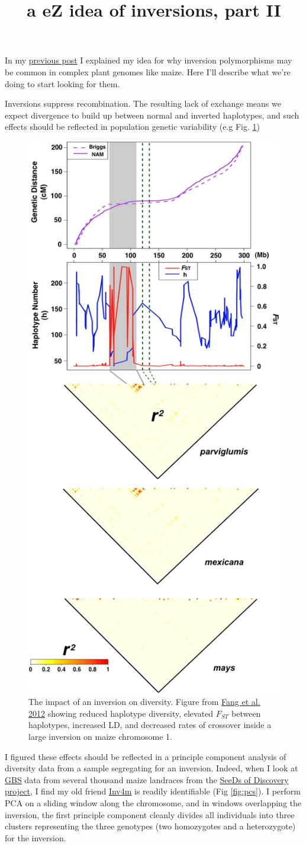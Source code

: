 \documentclass[]{article}
\begin{document}
\title{a eZ idea of inversions, part II}
\maketitle

In my \href{}{previous post} I explained my idea for why inversion polymorphisms may be common in complex plant genomes like maize. 
Here I'll describe what we're doing to start looking for them.

Inversions suppress recombination. 
The resulting lack of exchange means we expect divergence to build up between normal and inverted haplotypes, and such effects should be reflected in population genetic variability (e.g Fig. \ref{fig:fang})

\begin{figure}   
   \includegraphics[width=0.3\linewidth]{883fig1.png}
   \caption{The impact of an inversion on diversity. Figure from \href{http://www.genetics.org/content/191/3/883}{Fang et al. 2012} showing reduced haplotype diversity, elevated $F_{ST}$ between haplotypes, increased LD, and decreased rates of crossover inside a large inversion on maize chromosome 1.} 
    \label{fig:fang}
\end{figure}

I figured these effects should be reflected in a principle component analysis of diversity data from a sample segregating for an inversion.  
Indeed, when I look at \href{http://www.ncbi.nlm.nih.gov/pmc/articles/PMC3087801/}{GBS} data from several thousand maize landraces from the \href{http://seedsofdiscovery.org/maize/}{SeeDs of Discovery project}, I find my old friend \href{http://gbe.oxfordjournals.org/content/5/9/1594.full}{Inv4m} is readily identifiable (Fig \ref{fig:pcs}). 
I perform PCA on a sliding window along the chromosome, and in windows overlapping the inversion, the first principle component cleanly divides all individuals into three clusters representing the three genotypes (two homozygotes and a heterozygote) for the inversion.
\end{document}
